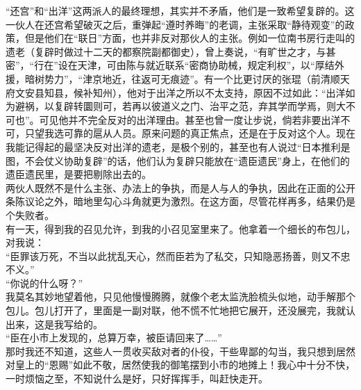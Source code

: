 “还宫”和“出洋”这两派人的最终理想，其实并不矛盾，他们是一致希望复辟的。这一伙人在还宫希望破灭之后，重弹起“遵时养晦”的老调，主张采取“静待观变”的政策，但是他们在“联日”方面，也并非反对那伙人的主张。例如一位南书房行走叫的遗老（复辟时做过十二天的都察院副都御史），曾上奏说，“有旷世之才，与甚密”，“行在”设在天津，可由陈与就近联系“密商协助械，规定利权”，以“厚结外援，暗树势力”，“津京地近，往返可无痕迹”。有一个比更讨厌的张琨（前清顺天府文安县知县，候补知州），他对于出洋之所以不太支持，原因不过如此：“出洋如为避祸，以复辟转圜则可，若再以彼道义之门、治平之范，弃其学而学焉，则大不可也”。可见他并不完全反对的出洋理由。甚至也曾一度让步说，倘若非要出洋不可，只望我选可靠的扈从人员。原来问题的真正焦点，还是在于反对这个人。现在我能记得起的最坚决反对出洋的遗老，是极个别的，甚至也有人说过“日本推利是图，不会仗义协助复辟”的话，他们认为复辟只能放在“遗臣遗民”身上，在他们的遗臣遗民里，是要把剔除出去的。\\

两伙人既然不是什么主张、办法上的争执，而是人与人的争执，因此在正面的公开条陈议论之外，暗地里勾心斗角就更为激烈。在这方面，尽管花样再多，结果仍是个失败者。\\

有一天，得到我的召见允许，到我的小召见室里来了。他拿着一个细长的布包儿，对我说：\\

“臣罪该万死，不当以此扰乱天心，然而臣若为了私交，只知隐恶扬善，则又不忠不义。”\\

“你说的什么呀？”\\

我莫名其妙地望着他，只见他慢慢腾腾，就像个老太监洗脸梳头似地，动手解那个包儿。包儿打开了，里面是一副对联，他不慌不忙地把它展开，还没展完，我就认出来，这是我写给的。\\

“臣在小市上发现的，总算万幸，被臣请回来了……”\\

那时我还不知道，这些人一贯收买敌对者的仆役，干些卑鄙的勾当，我只想到居然对皇上的“恩赐”如此不敬，居然使我的御笔摆到小市的地摊上！我心中十分不快，一时烦恼之至，不知说什么是好，只好挥挥手，叫赶快走开。\\

